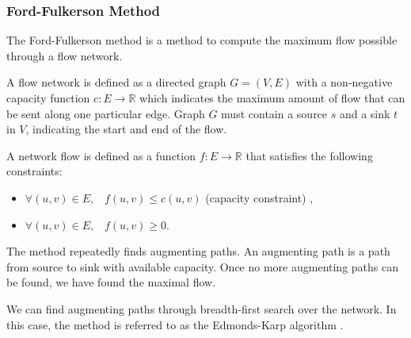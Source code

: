 \begin{algorithm}
\begin{algorithmic}
            \EndWhile
        
        \EndProcedure
                \Else
                \EndIf
            \EndFor
        \EndProcedure
  
        
        
    \end{algorithmic}
    
\end{algorithm}



\subsubsection{Ford-Fulkerson Method}

The Ford-Fulkerson method is a method to compute the maximum flow possible through a flow network.

A flow network is defined as a directed graph $G= (V,E)$ with a non-negative capacity function $c: E \to \mathbb{R}$ \cite{networkflow} which indicates the maximum amount of flow that can be sent along one particular edge. Graph $G$ must contain a source $s$ and a sink $t$ in $V$, indicating the start and end of the flow.

A network flow is defined as a function $f: E \to \mathbb{R}$ that satisfies the following constraints:

\begin{itemize}
    \item $\forall(u,v) \in E, \;\;\; f(u,v) \leq c(u,v)$  (capacity constraint)  \cite{networkflow},
    \item $\forall(u,v) \in E, \;\;\; f(u,v) \geq 0$.
\end{itemize}

The method repeatedly finds augmenting paths. An augmenting path is a path from source to sink with available capacity. Once no more augmenting paths can be found, we have found the maximal flow.

We can find augmenting paths through breadth-first search over the network. In this case, the method is referred to as the Edmonds-Karp algorithm \cite{networkflow}.



